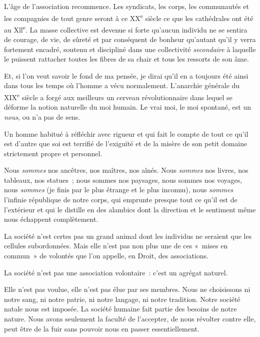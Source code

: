 \documentclass[french,twoside]{book} %
\newcommand{\astermono}{\medskip\centerline{\color{rubric}\large\selectfont{\syms ✻}}\medskip\par}%
\begin{document}
\astermono

\noindent L’âge de l’association recommence. Les syndicats, les corps, les communautés et les compagnies de tout genre seront à ce XX\textsuperscript{e} siècle ce que les cathédrales ont été au Xll\textsuperscript{e}. La masse collective est devenue si forte qu’aucun individu ne se sentira de courage, de vie, de sûreté et par conséquent de bonheur qu’autant qu’il y verra fortement encadré, soutenu et discipliné dans une collectivité \emph{secondaire} à laquelle le puissent rattacher toutes les fibres de sa chair et tous les ressorts de son âme.\par
Et, si l’on veut savoir le fond de ma pensée, je dirai qu’il en a toujours été ainsi dans tous les temps où l’homme a vécu normalement. L’anarchie générale du XIX\textsuperscript{e} siècle a forgé aux meilleurs un cerveau révolutionnaire dans lequel se déforme la notion naturelle du moi humain. Le vrai moi, le moi spontané, est un \emph{nous}, ou n’a pas de sens.\par
Un homme habitué à réfléchir avec rigueur et qui fait le compte de tout ce qu’il est d’autre que soi est terrifié de l’exiguïté et de la misère de son petit domaine strictement propre et personnel.\par
Nous \emph{sommes} nos ancêtres, nos maîtres, nos aînés. Nous \emph{sommes} nos livres, nos tableaux, nos statues ; nous sommes nos paysages, nous sommes nos voyages, nous \emph{sommes} (je finis par le plus étrange et le plus inconnu), nous \emph{sommes} l’infinie république de notre corps, qui emprunte presque tout ce qu’il est de l’extérieur et qui le distille en des alambics dont la direction et le sentiment même nous échappent complètement.\par

\astermono

\noindent La société n’est certes pas un grand animal dont les individus ne seraient que les cellules subordonnées. Mais elle n’est pas non plus une de ces « mises en commun » de volontés que l’on appelle, en Droit, des associations.\par
La société n’est pas une association volontaire : c’est un agrégat naturel.\par
Elle n’est pas voulue, elle n’est pas élue par ses membres. Nous ne choisissons ni notre sang, ni notre patrie, ni notre langage, ni notre tradition. Notre société natale nous est imposée. La société humaine fait partie des besoins de notre nature. Nous avons seulement la faculté de l’accepter, de nous révolter contre elle, peut être de la fuir sans pouvoir nous en passer essentiellement.\par
\end{document}
